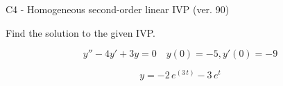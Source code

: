 \begin{exercise}
  \begin{exerciseTitle}C4 - Homogeneous second-order linear IVP (ver. 90)\end{exerciseTitle}
  \begin{exerciseStatement}
    
Find the solution to the given IVP.

    
\[y''-4y'+3y = 0 \hspace{1em} y(0) = -5 , y'(0) = -9\]

  \end{exerciseStatement}
  \begin{exerciseAnswer}
    
\[y= -2 \, e^{\left(3 \, t\right)} - 3 \, e^{t}\]

  \end{exerciseAnswer}
\end{exercise}